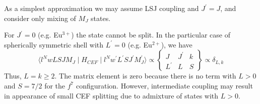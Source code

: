 \documentclass[a4paper,oneside,12pt]{extarticle}
\begin{document}
As a simplest approximation we may assume LSJ coupling and $J^{\prime}=J$, and consider only mixing of $M_J$ states.

For $J^{\prime}=0$ (e.g. Eu$^{3+}$) the state cannot be split. In the particular case of spherically symmetric shell with $L^{\prime}=0$ (e.g. Eu$^{2+}$), we have
%
\begin{equation}
\langle l^N wLSJM_J \mid H_{CEF} \mid l^N w^{\prime}L^{\prime}SJ^{\prime}M_J^{\prime} \rangle \propto
\left \{
\begin{array}{ccc}
J & J^{\prime} & k \\
L^{\prime} & L & S
\end{array}
\right \} \propto
\delta_{L, k}
\end{equation}
%
Thus, $L=k\geq 2$. The matrix element is zero because there is no term with $L>0$ and $S=7/2$ for the $f^7$ configuration. However, intermediate coupling may result in appearance of small CEF splitting due to admixture of states with $L>0$.
\end{document}

